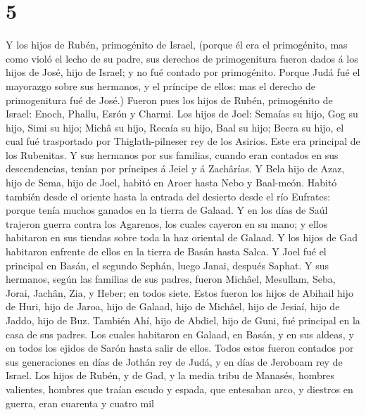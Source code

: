 \hypertarget{section-4}{%
\section{5}\label{section-4}}

 Y los hijos de Rubén, primogénito de Israel, (porque él
era el primogénito, mas como violó el lecho de su padre, sus derechos de
primogenitura fueron dados á los hijos de José, hijo de Israel; y no fué
contado por primogénito.  Porque Judá fué el mayorazgo
sobre sus hermanos, y el príncipe de ellos: mas el derecho de
primogenitura fué de José.)  Fueron pues los hijos de
Rubén, primogénito de Israel: Enoch, Phallu, Esrón y Charmi.
 Los hijos de Joel: Semaías su hijo, Gog su hijo, Simi su
hijo;  Michâ su hijo, Recaía su hijo, Baal su hijo;
 Beera su hijo, el cual fué trasportado por
Thiglath-pilneser rey de los Asirios. Este era principal de los
Rubenitas.  Y sus hermanos por sus familias, cuando eran
contados en sus descendencias, tenían por príncipes á Jeiel y á
Zachârías.  Y Bela hijo de Azaz, hijo de Sema, hijo de
Joel, habitó en Aroer hasta Nebo y Baal-meón.  Habitó
también desde el oriente hasta la entrada del desierto desde el río
Eufrates: porque tenía muchos ganados en la tierra de Galaad.
 Y en los días de Saúl trajeron guerra contra los
Agarenos, los cuales cayeron en su mano; y ellos habitaron en sus
tiendas sobre toda la haz oriental de Galaad.  Y los
hijos de Gad habitaron enfrente de ellos en la tierra de Basán hasta
Salca.  Y Joel fué el principal en Basán, el segundo
Sephán, luego Janai, después Saphat.  Y sus hermanos,
según las familias de sus padres, fueron Michâel, Mesullam, Seba, Jorai,
Jachân, Zia, y Heber; en todos siete.  Estos fueron los
hijos de Abihail hijo de Huri, hijo de Jaroa, hijo de Galaad, hijo de
Michâel, hijo de Jesiaí, hijo de Jaddo, hijo de Buz. 
También Ahí, hijo de Abdiel, hijo de Guni, fué principal en la casa de
sus padres.  Los cuales habitaron en Galaad, en Basán, y
en sus aldeas, y en todos los ejidos de Sarón hasta salir de ellos.
 Todos estos fueron contados por sus generaciones en días
de Jothán rey de Judá, y en días de Jeroboam rey de Israel.
 Los hijos de Rubén, y de Gad, y la media tribu de
Manasés, hombres valientes, hombres que traían escudo y espada, que
entesaban arco, y diestros en guerra, eran cuarenta y cuatro mil
